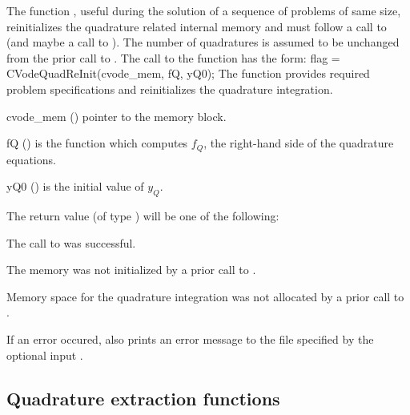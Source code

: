 The function , useful during the solution of a sequence of problems of 
same size, reinitializes the quadrature related internal memory 
and must follow a call to  (and maybe a call to ). 
The number  of quadratures is assumed to be unchanged from the prior call to 
.
The call to the  function has the form:
{
  flag = CVodeQuadReInit(cvode\_mem, fQ, yQ0);
}
{
  The function  provides required problem specifications 
  and reinitializes the quadrature integration.
}
{
  \begin{args}
  \item[cvode\_mem] ()
    pointer to the {\cvodes} memory block.
  \item[fQ] ()
    is the {\C} function which computes $f_Q$, the right-hand side of the quadrature
    equations.
  \item[yQ0] ()
    is the initial value of $y_Q$.
  \end{args}
}
{
  The return value  (of type ) will be one of the following:
  \begin{args}
  \item[\Id{CV\_SUCCESS}]
    The call to  was successful.
  \item[\Id{CV\_MEM\_NULL}] 
    The {\cvodes} memory was not initialized by a prior call to .
  \item[\Id{CV\_NO\_QUAD}] 
    Memory space for the quadrature integration was not allocated by a prior
    call to .
  \end{args}
}
{
  If an error occured,  also prints an error message to the
  file specified by the optional input .
}


\subsection{Quadrature extraction functions}\label{ss:quad_get}


